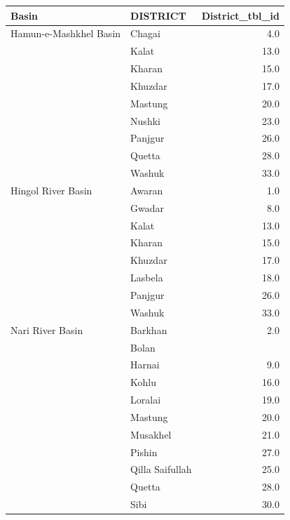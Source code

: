 \begin{longtable}[H]{| l | l | r |}
    \hline
    Basin                  & DISTRICT        & District\_tbl\_id \\
    \hline
    Hamun-e-Mashkhel Basin & Chagai          & 4.0               \\
    & Kalat           & 13.0              \\
    & Kharan          & 15.0              \\
    & Khuzdar         & 17.0              \\
    & Mastung         & 20.0              \\
    & Nushki          & 23.0              \\
    & Panjgur         & 26.0              \\
    & Quetta          & 28.0              \\
    & Washuk          & 33.0              \\
    \hline
    Hingol River Basin     & Awaran          & 1.0               \\
    & Gwadar          & 8.0               \\
    & Kalat           & 13.0              \\
    & Kharan          & 15.0              \\
    & Khuzdar         & 17.0              \\
    & Lasbela         & 18.0              \\
    & Panjgur         & 26.0              \\
    & Washuk          & 33.0              \\
    \hline
    Nari River Basin       & Barkhan         & 2.0               \\
    & Bolan           &                   \\
    & Harnai          & 9.0               \\
    & Kohlu           & 16.0              \\
    & Loralai         & 19.0              \\
    & Mastung         & 20.0              \\
    & Musakhel        & 21.0              \\
    & Pishin          & 27.0              \\
    & Qilla Saifullah & 25.0              \\
    & Quetta          & 28.0              \\
    & Sibi            & 30.0              \\

\end{longtable}
